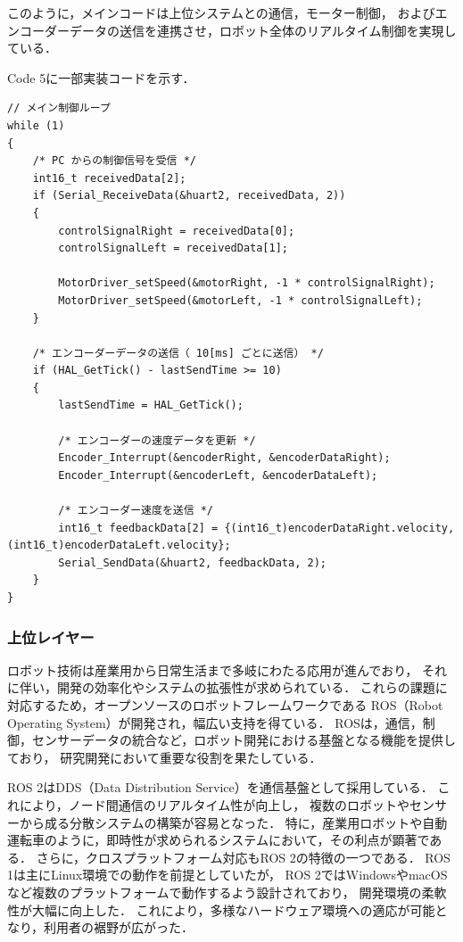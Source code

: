 このように，メインコードは上位システムとの通信，モーター制御，
およびエンコーダーデータの送信を連携させ，ロボット全体のリアルタイム制御を実現している．


Code 5に一部実装コードを示す．

\lstset{language=C, caption=メイン制御ループ (main.c)}
\begin{lstlisting}
// メイン制御ループ
while (1)
{
    /* PC からの制御信号を受信 */
    int16_t receivedData[2];
    if (Serial_ReceiveData(&huart2, receivedData, 2))
    {
        controlSignalRight = receivedData[0];
        controlSignalLeft = receivedData[1];

        MotorDriver_setSpeed(&motorRight, -1 * controlSignalRight);
        MotorDriver_setSpeed(&motorLeft, -1 * controlSignalLeft);
    }

    /* エンコーダーデータの送信（ 10[ms] ごとに送信） */
    if (HAL_GetTick() - lastSendTime >= 10)
    {
        lastSendTime = HAL_GetTick();

        /* エンコーダーの速度データを更新 */
        Encoder_Interrupt(&encoderRight, &encoderDataRight);
        Encoder_Interrupt(&encoderLeft, &encoderDataLeft);

        /* エンコーダー速度を送信 */
        int16_t feedbackData[2] = {(int16_t)encoderDataRight.velocity, (int16_t)encoderDataLeft.velocity};
        Serial_SendData(&huart2, feedbackData, 2);
    }
}
\end{lstlisting}
\newpage

\subsubsection{上位レイヤー}

ロボット技術は産業用から日常生活まで多岐にわたる応用が進んでおり，
それに伴い，開発の効率化やシステムの拡張性が求められている．
これらの課題に対応するため，オープンソースのロボットフレームワークである
ROS（Robot Operating System）が開発され，幅広い支持を得ている．
ROSは，通信，制御，センサーデータの統合など，ロボット開発における基盤となる機能を提供しており，
研究開発において重要な役割を果たしている．

ROS 2はDDS（Data Distribution Service）を通信基盤として採用している．
これにより，ノード間通信のリアルタイム性が向上し，
複数のロボットやセンサーから成る分散システムの構築が容易となった\cite{ros2design}．
特に，産業用ロボットや自動運転車のように，即時性が求められるシステムにおいて，その利点が顕著である．
さらに，クロスプラットフォーム対応もROS 2の特徴の一つである．
ROS 1は主にLinux環境での動作を前提としていたが，
ROS 2ではWindowsやmacOSなど複数のプラットフォームで動作するよう設計されており，
開発環境の柔軟性が大幅に向上した\cite{ros2docs}．
これにより，多様なハードウェア環境への適応が可能となり，利用者の裾野が広がった．

